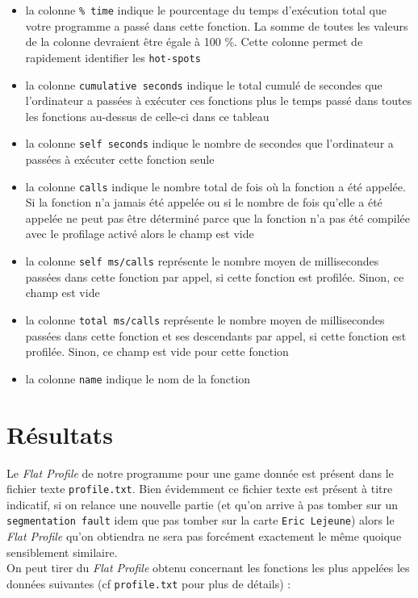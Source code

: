 \documentclass[a4paper, 12pt]{article}
\begin{document}
\begin{itemize}[label=$\cdot$]
    \item la colonne \verb|% time| indique le pourcentage du temps d'exécution total que votre programme a passé dans cette fonction. La somme de toutes les valeurs de la colonne devraient être égale à 100 \%. Cette colonne permet de rapidement identifier les \verb|hot-spots|
    \item la colonne \verb|cumulative seconds| indique le total cumulé de secondes que l'ordinateur a passées à exécuter ces fonctions plus le temps passé dans toutes les fonctions au-dessus de celle-ci dans ce tableau
    \item la colonne \verb|self seconds| indique le nombre de secondes que l'ordinateur a passées à exécuter cette fonction seule
    \item la colonne \verb|calls| indique le nombre total de fois où la fonction a été appelée. Si la fonction n'a jamais été appelée ou si le nombre de fois qu'elle a été appelée ne peut pas être déterminé parce que la fonction n'a pas été compilée avec le profilage activé alors le champ est vide
    \item la colonne \verb|self ms/calls| représente le nombre moyen de millisecondes passées dans cette fonction par appel, si cette fonction est profilée. Sinon, ce champ est vide
    \item la colonne \verb|total ms/calls| représente le nombre moyen de millisecondes passées dans cette fonction et ses descendants par appel, si cette fonction est profilée. Sinon, ce champ est vide pour cette fonction
    \item la colonne \verb|name| indique le nom de la fonction
\end{itemize}

\section{Résultats}

Le \emph{Flat Profile} de notre programme pour une game donnée est présent dans le fichier texte \verb|profile.txt|. Bien évidemment ce fichier texte est présent à titre indicatif, si on relance une nouvelle partie (et qu'on arrive à pas tomber sur un \verb|segmentation fault| idem que pas tomber sur la carte \verb|Eric Lejeune|) alors le \emph{Flat Profile} qu'on obtiendra ne sera pas forcément exactement le même quoique sensiblement similaire.\\

On peut tirer du \emph{Flat Profile} obtenu concernant les fonctions les plus appelées les données suivantes (cf \verb|profile.txt| pour plus de détails) :
\end{document}
